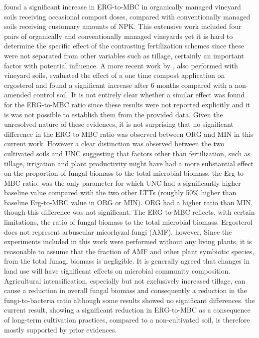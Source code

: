	\citet{probst2008} found a significant increase in ERG-to-MBC in organically managed vineyard soils receiving occasional compost doses, compared with conventionally managed soils receiving customary amounts of NPK. This extensive work included four pairs of organically and conventionally managed vineyards yet it is hard to determine the specific effect of the contrasting fertilization schemes since these were not separated from other variables such as tillage, certainly an important factor with potential influence. A more recent work by \citet{mackie2015} , also performed with vineyard soils, evaluated the effect of a one time compost application on ergosterol and found a significant increase after 6 months compared with a non-amended control soil. It is not entirely clear whether a similar effect was found for the ERG-to-MBC ratio since these results were not reported explicitly and it is was not possible to establish them from the provided data.
	Given the unresolved nature of these evidences, it is not surprising that no significant difference in the ERG-to-MBC ratio was observed between ORG and MIN in this current work. However a clear distinction was observed between the two cultivated soils and UNC suggesting that factors other than fertilization, such as tillage, irrigation and plant productivity might have had a more substantial effect on the proportion of fungal biomass to the total microbial biomass.
	the Erg-to-MBC ratio, was the only parameter for which UNC had a significantly higher baseline value compared with the two other LTTs (roughly 50\% higher than baseline Erg-to-MBC value in ORG or MIN).
	ORG had a higher ratio than MIN, though this difference was not significant. The ERG-to-MBC reflects, with certain limitations, the ratio of fungal biomass to the total microbial biomass. Ergosterol does not represent arbuscular micorhyzal fungi (AMF), however, Since the experiments included in this work were performed without any living plants, it is reasonable to assume that the fraction of AMF and other plant symbiotic species, from the total funagl biomass is negligible.
	It is generally agreed that changes in land use will have significant effects on microbial community composition\myRed{*}. Agricultural intensification, especially but not exclusively increased tillage, can cause a reduction in overall fungal biomass and consequently a reduction in the fungi-to-bacteria ratio\myRed{*} although some results showed no significant differences\myRed{*}.
	the current result, showing a significant reduction in ERG-to-MBC as a consequence of long-term cultivation practices, compared to a non-cultivated soil, is therefore mostly supported by prior evidences.
